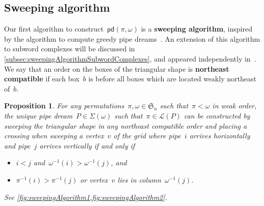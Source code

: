 \documentclass[reqno]{amsart}
\newtheorem{proposition}[theorem]{Proposition}
\theoremstyle{definition}
\newcommand{\defn}[1]{\textbf{\textsf{\color{PineGreen} #1}}} %
\newcommand{\vincent}[1]{\todo[color=blue!30]{#1 \\ \hfill --- V.}}
\newcommand{\fS}{\mathfrak{S}} %
\newcommand{\acyclicPipeDreams}{\Sigma} %
\newcommand{\linearExtensions}{\mathcal{L}} %
\newcommand{\insertion}[2]{\mathsf{pd}(#1,#2)} %
\begin{document}


\subsection{Sweeping algorithm}
\label{subsec:sweepingAlgorithm}

Our first algorithm to construct~$\insertion{\pi}{\omega}$ is a \defn{sweeping algorithm}, inspired by the algorithm to compute greedy pipe dreams~\cite{PilaudPocchiola, PilaudStump-ELlabelings}.
An extension of this algorithm to subword complexes will be discussed in \cref{subsec:sweepingAlgorithmSubwordComplexes}, and appeared independently in~\cite{JahnStump}.
We say that an order on the boxes of the triangular shape is \defn{northeast compatible} if each box~$b$ is before all boxes which are located weakly northeast of~$b$.

\begin{proposition}
\label{prop:sweepingAlgorithm}
For any permutations~$\pi,\omega \in \fS_n$ such that~$\pi < \omega$ in weak order, the unique pipe dream~$P \in \acyclicPipeDreams(\omega)$ such that~$\pi \in \linearExtensions(P)$ can be constructed by sweeping the triangular shape in any northeast compatible order and placing a crossing when sweeping a vertex~$v$ of the grid where pipe~$i$ arrives horizontally and pipe~$j$ arrives vertically if and only if
\begin{itemize}
\item $i < j$ and~$\omega^{-1}(i) > \omega^{-1}(j)$, and 
\item $\pi^{-1}(i) > \pi^{-1}(j)$ or vertex~$v$ lies in column~$\omega^{-1}(j)$.
\end{itemize}
See \cref{fig:sweepingAlgorithm1,fig:sweepingAlgorithm2}.
\end{proposition}
\end{document}
